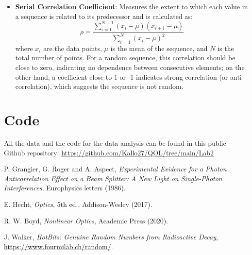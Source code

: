 \documentclass[prl,twocolumn]{revtex4-1}
\begin{document}
\begin{itemize}
    \item \textbf{Serial Correlation Coefficient}: Measures the extent to which each value in a sequence is related to its predecessor and is calculated as:
    \begin{equation}
        \rho = \frac{\sum_{i=1}^{N-1} (x_i - \mu)(x_{i+1} - \mu)}{\sum_{i=1}^{N} (x_i - \mu)^2}
    \end{equation}
    where $x_i$ are the data points, $\mu$ is the mean of the sequence, and $N$ is the total number of points.  For a random sequence, this correlation should be close to zero, indicating no dependence between consecutive elements; on the other hand, a coefficient close to 1 or -1 indicates strong correlation (or anti-correlation), which suggests the sequence is not random.
\end{itemize}

\section{Code}
All the data and the code for the data analysis can be found in this public Github repository: \href{https://github.com/Kallo27/QOL/tree/main/Lab2}{https://github.com/Kallo27/QOL/tree/main/Lab2}

\begin{thebibliography}{99}

  P. Grangier, G. Roger and A. Aspect, \textit{Experimental Evidence for a Photon Anticorrelation Effect on a Beam Splitter: A New Light on Single-Photon Interferences}, Europhysics letters (1986).

  E. Hecht, \textit{Optics}, 5th ed., Addison-Wesley (2017).
  
  R. W. Boyd, \textit{Nonlinear Optics}, Academic Press (2020).

  J. Walker, \textit{HotBits: Genuine Random Numbers from Radioactive Decay}, \href{https://www.fourmilab.ch/random/}{https://www.fourmilab.ch/random/}.

\end{thebibliography}
\end{document}
